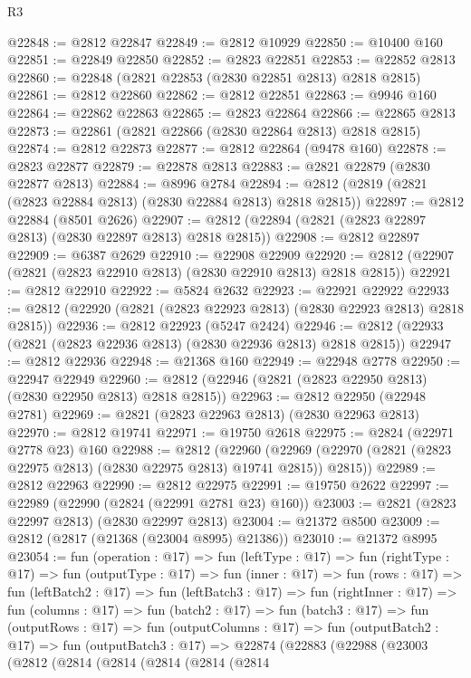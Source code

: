 \begin{lexlean}{R3}
\begin{coremodule}
@22848 := @2812 @22847
@22849 := @2812 @10929
@22850 := @10400 @160
@22851 := @22849 @22850
@22852 := @2823 @22851
@22853 := @22852 @2813
@22860 := @22848 (@2821 @22853 (@2830 @22851 @2813) @2818 @2815)
@22861 := @2812 @22860
@22862 := @2812 @22851
@22863 := @9946 @160
@22864 := @22862 @22863
@22865 := @2823 @22864
@22866 := @22865 @2813
@22873 := @22861 (@2821 @22866 (@2830 @22864 @2813) @2818 @2815)
@22874 := @2812 @22873
@22877 := @2812 @22864 (@9478 @160)
@22878 := @2823 @22877
@22879 := @22878 @2813
@22883 := @2821 @22879 (@2830 @22877 @2813)
@22884 := @8996 @2784
@22894 := @2812 (@2819 (@2821 (@2823 @22884 @2813) (@2830 @22884 @2813) @2818 @2815))
@22897 := @2812 @22884 (@8501 @2626)
@22907 := @2812 (@22894 (@2821 (@2823 @22897 @2813) (@2830 @22897 @2813) @2818 @2815))
@22908 := @2812 @22897
@22909 := @6387 @2629
@22910 := @22908 @22909
@22920 := @2812 (@22907 (@2821 (@2823 @22910 @2813) (@2830 @22910 @2813) @2818 @2815))
@22921 := @2812 @22910
@22922 := @5824 @2632
@22923 := @22921 @22922
@22933 := @2812 (@22920 (@2821 (@2823 @22923 @2813) (@2830 @22923 @2813) @2818 @2815))
@22936 := @2812 @22923 (@5247 @2424)
@22946 := @2812 (@22933 (@2821 (@2823 @22936 @2813) (@2830 @22936 @2813) @2818 @2815))
@22947 := @2812 @22936
@22948 := @21368 @160
@22949 := @22948 @2778
@22950 := @22947 @22949
@22960 := @2812 (@22946 (@2821 (@2823 @22950 @2813) (@2830 @22950 @2813) @2818 @2815))
@22963 := @2812 @22950 (@22948 @2781)
@22969 := @2821 (@2823 @22963 @2813) (@2830 @22963 @2813)
@22970 := @2812 @19741
@22971 := @19750 @2618
@22975 := @2824 (@22971 @2778 @23) @160
@22988 := @2812
    (@22960 (@22969 (@22970 (@2821 (@2823 @22975 @2813) (@2830 @22975 @2813) @19741 @2815)) @2815))
@22989 := @2812 @22963
@22990 := @2812 @22975
@22991 := @19750 @2622
@22997 := @22989 (@22990 (@2824 (@22991 @2781 @23) @160))
@23003 := @2821 (@2823 @22997 @2813) (@2830 @22997 @2813)
@23004 := @21372 @8500
@23009 := @2812 (@2817 (@21368 (@23004 @8995) @21386))
@23010 := @21372 @8995
@23054 := fun (operation : @17) =>
  fun (leftType : @17) =>
  fun (rightType : @17) =>
  fun (outputType : @17) =>
  fun (inner : @17) =>
  fun (rows : @17) =>
  fun (leftBatch2 : @17) =>
  fun (leftBatch3 : @17) =>
  fun (rightInner : @17) =>
  fun (columns : @17) =>
  fun (batch2 : @17) =>
  fun (batch3 : @17) =>
  fun (outputRows : @17) =>
  fun (outputColumns : @17) =>
  fun (outputBatch2 : @17) =>
  fun (outputBatch3 : @17) =>
  @22874
    (@22883
      (@22988
        (@23003
          (@2812
            (@2814
              (@2814
                (@2814
                  (@2814
                    (@2814

\end{coremodule}
\end{lexlean}
